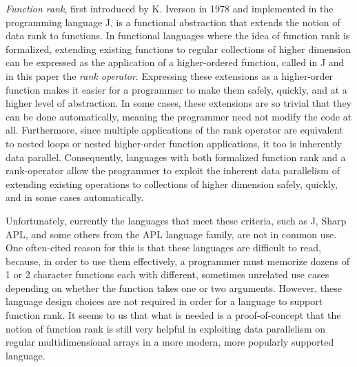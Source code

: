 \textit{Function rank}, first introduced by K. Iverson in 1978\cite{opandfunc} and implemented in the programming language J, is a functional abstraction that extends the notion of data rank to functions. %
In functional languages where the idea of function rank is formalized, extending existing functions to regular collections of higher dimension can be expressed as the application of a higher-ordered function, 
called in J and in this paper the \textit{rank operator}. \cite{jvocab}
Expressing these extensions as a higher-order function makes it easier for a programmer to make them safely, quickly, and at a higher level of abstraction.
In some cases, these extensions are so trivial that they can be done automatically, meaning the programmer need not modify the code at all. %
Furthermore, since multiple applications of the rank operator are equivalent to nested loops or nested higher-order function applications, it too is inherently data parallel.
Consequently, languages with both formalized function rank and a rank-operator allow the programmer to 
exploit the inherent data parallelism of extending existing operations to collections of higher dimension safely, quickly, and in some cases automatically.

Unfortunately, currently the languages that meet these criteria, such as J, Sharp APL, and some others from the APL language family, are not in common use.
One often-cited reason for this is that these languages are difficult to read, %
because, in order to use them effectively, a programmer must memorize dozens of 1 or 2 character functions each with different, sometimes unrelated use cases depending on whether the function takes one or two arguments.\cite{jvocab} %
However, these language design choices are not required in order for a language to support function rank.
It seems to us that what is needed is a proof-of-concept that the notion of function rank is still very helpful in exploiting data parallelism on regular multidimensional arrays in a more modern, more popularly supported language.


